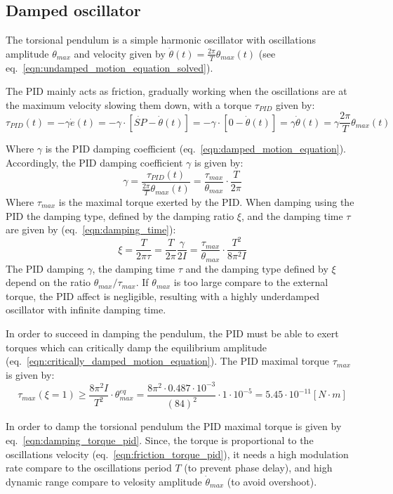 \documentclass[\main/master.tex]{subfiles}
\begin{document}
\subsection{Damped oscillator}
The torsional pendulum is a simple harmonic oscillator with oscillations amplitude $\theta_{max}$ and velocity given by $\dot{\theta}(t) =\frac{2\pi}{T} \theta_{max}( t)$ (see eq.~\ref{eqn:undamped_motion_equation_solved}). 
\par\noindent
The PID mainly acts as friction, gradually working when the oscillations are at the maximum velocity slowing them down, with a torque $\tau_{PID}$ given by:
\begin{equation}
\tau_{PID}(t) = -\gamma\dot{e}(t) =  -\gamma\cdot [\dot{SP} -\dot{\theta}(t)] =-\gamma\cdot [0-\dot{\theta}(t)]  =  \gamma\dot{\theta}(t) =  \gamma\frac{2\pi}{T} \theta_{max}( t) 
\label{eqn:friction_torque_pid}
\end{equation}
\par\noindent
Where $\gamma$ is the PID damping coefficient (eq.~\ref{eqn:damped_motion_equation}). Accordingly, the PID damping coefficient $\gamma$ is given by:
\begin{equation}
\gamma  =  \frac{\tau_{PID}(t)}{\frac{2\pi}{T} \theta_{max}( t) } =\frac{\tau_{max}}{\theta_{max}}\cdot \frac{ T}{2\pi}          \label{eqn:pid damping coefficient}
\end{equation}
Where $\tau_{max}$ is the maximal torque exerted by the PID. When damping using the PID the damping type, defined by the damping ratio $\xi$, and the damping time $\tau$ are given by (eq.~\ref{eqn:damping_time}):
\begin{equation}
\xi = \frac{T}{2 \pi \tau } =  \frac{T}{2 \pi  }\frac{\gamma}{2I}  = \frac{ \tau_{max}}{\theta_{max}} \cdot \frac{T^2}{8\pi^2 I}  \label{eqn:damping_time_pid}
\end{equation}
The PID damping $\gamma$, the damping time $\tau$ and the damping type defined by $\xi$ depend on the ratio $\theta_{max}/\tau_{max}$. If $\theta_{max}$ is too large compare to the external torque, the PID affect is negligible, resulting with a highly underdamped oscillator with infinite damping time. 
\par\noindent
In order to succeed in damping the pendulum, the PID must be able to exert torques which can critically damp the equilibrium amplitude (eq.~\ref{eqn:critically_damped_motion_equation}). The PID maximal torque $\tau_{max} $ is given by:
\begin{equation}
\tau_{max} (\xi = 1)\geq\frac{ 8 \pi^2 I }{T^2}\cdot\theta_{max}^{eq} = \frac{  8 \pi^2 \cdot 0.487\cdot10^{-3} }{(84)^2}\cdot 1\cdot10^{-5} = 5.45\cdot10^{-11}[N\cdot m]
\label{eqn:damping_torque_pid}
\end{equation}
\par\noindent
In order to damp the torsional pendulum the PID maximal torque is given by eq.~\ref{eqn:damping_torque_pid}. Since, the torque is proportional to the oscillations velocity (eq.~\ref{eqn:friction_torque_pid}), it needs a high modulation rate compare to the oscillations period $T$ (to prevent phase delay), and high dynamic range compare to velosity amplitude $\dot{\theta}_{max}$ (to avoid overshoot). 
\end{document}
